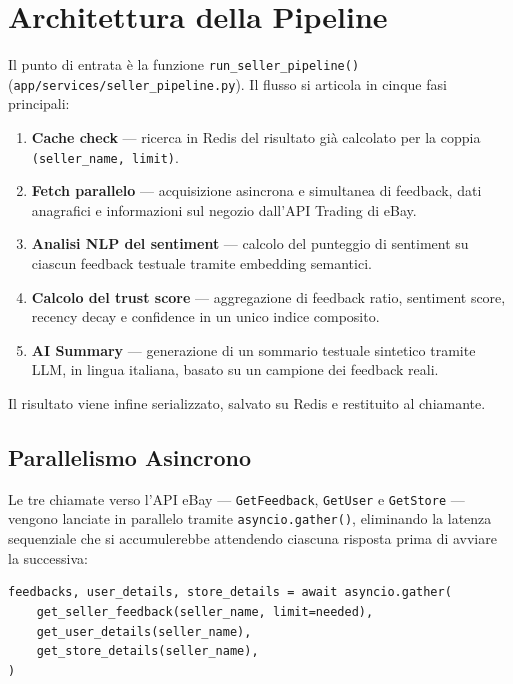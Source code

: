 \section{Architettura della Pipeline}
\label{sec:seller-arch}

Il punto di entrata è la funzione \texttt{run\_seller\_pipeline()}
(\texttt{app/services/seller\_pipeline.py}). Il flusso si articola in
cinque fasi principali:

\begin{enumerate}
    \item \textbf{Cache check} — ricerca in Redis del risultato già
        calcolato per la coppia \texttt{(seller\_name, limit)}.
    \item \textbf{Fetch parallelo} — acquisizione asincrona e simultanea
        di feedback, dati anagrafici e informazioni sul negozio
        dall'API Trading di eBay.
    \item \textbf{Analisi NLP del sentiment} — calcolo del punteggio
        di sentiment su ciascun feedback testuale tramite embedding
        semantici.
    \item \textbf{Calcolo del trust score} — aggregazione di feedback
        ratio, sentiment score, recency decay e confidence in un unico
        indice composito.
    \item \textbf{AI Summary} — generazione di un sommario testuale
        sintetico tramite LLM, in lingua italiana, basato su un
        campione dei feedback reali.
\end{enumerate}

Il risultato viene infine serializzato, salvato su Redis e restituito
al chiamante.

\subsection{Parallelismo Asincrono}
\label{subsec:seller-async}

Le tre chiamate verso l'API eBay — \texttt{GetFeedback},
\texttt{GetUser} e \texttt{GetStore} — vengono lanciate in parallelo
tramite \texttt{asyncio.gather()}, eliminando la latenza sequenziale
che si accumulerebbe attendendo ciascuna risposta prima di avviare la
successiva:

\begin{verbatim}
feedbacks, user_details, store_details = await asyncio.gather(
    get_seller_feedback(seller_name, limit=needed),
    get_user_details(seller_name),
    get_store_details(seller_name),
)
\end{verbatim}

